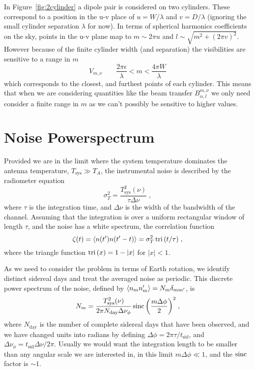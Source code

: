 \documentclass[prd,twocolumn,nofootinbib]{revtex4}
\begin{document}
In Figure~\ref{fig:2cylinder} a dipole pair is considered on two
cylinders. These correspond to a position in the u-v place of $u = W / \lambda$
and $v = D / \lambda$ (ignoring the small cylinder separation $\lambda$ for
now). In terms of spherical harmonics coefficients on the sky, points in the u-v
plane map to $m \sim 2\pi u$ and $l \sim \sqrt{m^2 + (2\pi v)^2}$. However
because of the finite cylinder width (and separation) the visibilities are
sensitive to a range in $m$
\begin{equation}
  V_{m,\nu} \qquad \frac{2 \pi \epsilon}{\lambda} < m < \frac{4 \pi
    W}{\lambda}
\end{equation}
which corresponds to the closest, and furthest points of each cylinder. This
means that when we are considering quantities like the beam transfer
$B_{\alpha,l}^{m,\nu}$ we only need consider a finite range in $m$ as we can't
possibly be sensitive to higher values.

\appendix


\section{Noise Powerspectrum}

Provided we are in the limit where the system temperature dominates the antenna
temperature, $T_\text{sys} \gg T_A$, the instrumental noise is described by the
radiometer equation
\begin{equation}
\sigma_T^2 = \frac{T_\text{sys}^2(\nu)}{\tau \Delta\nu} \; ,
\end{equation}
where $\tau$ is the integration time, and $\Delta\nu$ is the width of the
bandwidth of the channel. Assuming that the integration is over a uniform
rectangular window of length $\tau$, and the noise has a white spectrum, the
correlation function
\begin{equation}
\zeta(t) = \left\langle n(t') n(t' - t) \right\rangle = \sigma_T^2 \operatorname{tri}{(t / \tau)} \; ,
\end{equation}
where the triangle function $\operatorname{tri}{(x)} = 1 - \left\lvert x \right\rvert$ for
$\left\lvert x \right\rvert < 1$.

As we need to consider the problem in terms of Earth rotation, we identify
distinct sidereal days and treat the averaged noise as periodic. This discrete
power spectrum of the noise, defined by $\left\langle n_m n_m' \right\rangle = N_m \delta_{m m'}$,
is
\begin{equation}
N_m = \frac{T_\text{sys}^2(\nu)}{2 \pi N_\text{day} \Delta\nu_\phi} \operatorname{sinc}{\left(\frac{m
      \Delta\phi}{2}\right)}^2 \; ,
\end{equation}
where $N_\text{day}$ is the number of complete sidereal days that have been
observed, and we have changed units into radians by defining $\Delta\phi = 2\pi
\tau / t_\text{sid}$, and $\Delta\nu_\phi = t_\text{sid} \Delta\nu / 2\pi$.
Usually we would want the integration length to be smaller than any angular
scale we are interested in, in this limit $m \Delta\phi \ll 1$, and the $\operatorname{sinc}$
factor is $\sim 1$.
\end{document}
